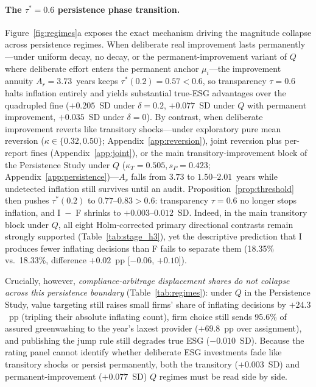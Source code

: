 \documentclass[11pt]{article}
\begin{document}
\paragraph{The $\tau^* = 0.6$ persistence phase transition.}
Figure~\ref{fig:regimes}a exposes the exact mechanism driving the magnitude collapse across persistence regimes. When deliberate real improvement lasts permanently---under uniform decay, no decay, or the permanent-improvement variant of $Q$ where deliberate effort enters the permanent anchor $\mu_i$---the improvement annuity $A_r = 3.73$~years keeps $\tau^*(0.2) = 0.57 < 0.6$, so transparency $\tau = 0.6$ halts inflation entirely and yields substantial true-ESG advantages over the quadrupled fine ($+0.205$~SD under $\delta = 0.2$, $+0.077$~SD under $Q$ with permanent improvement, $+0.035$~SD under $\delta = 0$). By contrast, when deliberate improvement reverts like transitory shocks---under exploratory pure mean reversion ($\kappa \in \{0.32, 0.50\}$; Appendix~\ref{app:reversion}), joint reversion plus per-report fines (Appendix~\ref{app:joint}), or the main transitory-improvement block of the Persistence Study under $Q$ ($\kappa_T = 0.505, s_P = 0.423$; Appendix~\ref{app:persistence})---$A_r$ falls from $3.73$ to $1.50$--$2.01$~years while undetected inflation still survives until an audit. Proposition~\ref{prop:threshold} then pushes $\tau^*(0.2)$ to $0.77$--$0.83 > 0.6$: transparency $\tau = 0.6$ no longer stops inflation, and I~$-$~F shrinks to $+0.003$--$0.012$~SD. Indeed, in the main transitory block under $Q$, all eight Holm-corrected primary directional contrasts remain strongly supported (Table~\ref{tab:stage_h3}), yet the descriptive prediction that I produces fewer inflating decisions than F fails to separate them (18.35\% vs.\ 18.33\%, difference $+0.02$~pp [$-0.06$, $+0.10$]).

Crucially, however, \emph{compliance-arbitrage displacement shares do not collapse across this persistence boundary} (Table~\ref{tab:regimes}): under $Q$ in the Persistence Study, value targeting still raises small firms' share of inflating decisions by $+24.3$~pp (tripling their absolute inflating count), firm choice still sends 95.6\% of assured greenwashing to the year's laxest provider ($+69.8$~pp over assignment), and publishing the jump rule still degrades true ESG ($-0.010$~SD). Because the rating panel cannot identify whether deliberate ESG investments fade like transitory shocks or persist permanently, both the transitory ($+0.003$~SD) and permanent-improvement ($+0.077$~SD) $Q$ regimes must be read side by side.
\end{document}
